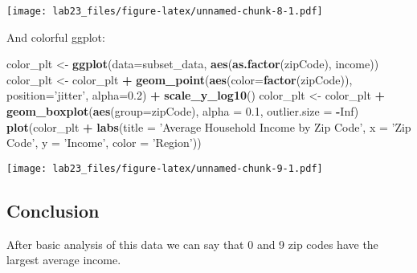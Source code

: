 \documentclass[
]{article}
\newenvironment{Shaded}{\begin{snugshade}}{\end{snugshade}}
\newcommand{\DataTypeTok}[1]{\textcolor[rgb]{0.13,0.29,0.53}{#1}}
\newcommand{\FloatTok}[1]{\textcolor[rgb]{0.00,0.00,0.81}{#1}}
\newcommand{\KeywordTok}[1]{\textcolor[rgb]{0.13,0.29,0.53}{\textbf{#1}}}
\newcommand{\NormalTok}[1]{#1}
\newcommand{\OperatorTok}[1]{\textcolor[rgb]{0.81,0.36,0.00}{\textbf{#1}}}
\newcommand{\OtherTok}[1]{\textcolor[rgb]{0.56,0.35,0.01}{#1}}
\newcommand{\StringTok}[1]{\textcolor[rgb]{0.31,0.60,0.02}{#1}}
\begin{document}
\texttt{[image: lab23\_files/figure-latex/unnamed-chunk-8-1.pdf]}

And colorful ggplot:

\begin{Shaded}
\begin{Highlighting}[]
\NormalTok{color_plt <-}\StringTok{ }\KeywordTok{ggplot}\NormalTok{(}\DataTypeTok{data=}\NormalTok{subset_data, }\KeywordTok{aes}\NormalTok{(}\KeywordTok{as.factor}\NormalTok{(zipCode), income))}
\NormalTok{color_plt <-}\StringTok{ }\NormalTok{color_plt }\OperatorTok{+}\StringTok{ }\KeywordTok{geom_point}\NormalTok{(}\KeywordTok{aes}\NormalTok{(}\DataTypeTok{color=}\KeywordTok{factor}\NormalTok{(zipCode)), }\DataTypeTok{position=}\StringTok{'jitter'}\NormalTok{, }\DataTypeTok{alpha=}\FloatTok{0.2}\NormalTok{) }\OperatorTok{+}\StringTok{ }\KeywordTok{scale_y_log10}\NormalTok{()}
\NormalTok{color_plt <-}\StringTok{ }\NormalTok{color_plt }\OperatorTok{+}\StringTok{ }\KeywordTok{geom_boxplot}\NormalTok{(}\KeywordTok{aes}\NormalTok{(}\DataTypeTok{group=}\NormalTok{zipCode), }\DataTypeTok{alpha =} \FloatTok{0.1}\NormalTok{, }\DataTypeTok{outlier.size =} \OperatorTok{-}\OtherTok{Inf}\NormalTok{)}
\KeywordTok{plot}\NormalTok{(color_plt }\OperatorTok{+}\StringTok{ }\KeywordTok{labs}\NormalTok{(}\DataTypeTok{title =} \StringTok{'Average Household Income by Zip Code'}\NormalTok{, }\DataTypeTok{x =} \StringTok{'Zip Code'}\NormalTok{, }\DataTypeTok{y =} \StringTok{'Income'}\NormalTok{, }\DataTypeTok{color =} \StringTok{'Region'}\NormalTok{))}
\end{Highlighting}
\end{Shaded}

\texttt{[image: lab23\_files/figure-latex/unnamed-chunk-9-1.pdf]}

\hypertarget{conclusion}{%
\subsection{Conclusion}\label{conclusion}}

After basic analysis of this data we can say that 0 and 9 zip codes have
the largest average income.
\end{document}
